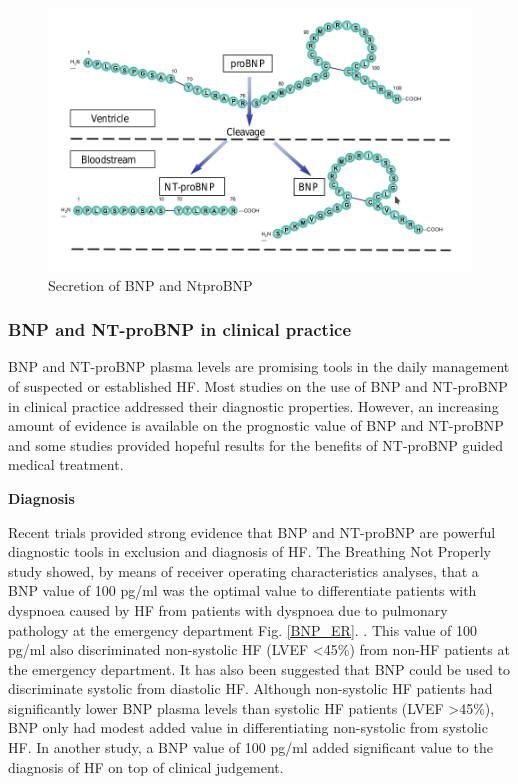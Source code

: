 \documentclass[14pt,a4paper,onecolumn]{extarticle}
\begin{document}
\begin{figure}
    \centering
    \includegraphics[scale=0.4]{../../images/BNP_secretion.png}
    \small\caption{Secretion of BNP and NtproBNP}
    \label{BNP_secretion}
\end{figure}

\subsubsection{BNP and NT-proBNP in clinical practice}
BNP and NT-proBNP plasma levels are promising tools in the daily management of suspected or established HF. Most studies on the use of BNP and NT-proBNP in clinical practice addressed their diagnostic properties. However, an increasing amount of evidence is available on the prognostic value of BNP and NT-proBNP and some studies provided hopeful results for the benefits of NT-proBNP guided medical treatment.

\textbf{Diagnosis}

Recent trials provided strong evidence that BNP and NT-proBNP are powerful diagnostic tools in exclusion and diagnosis of HF. The Breathing Not Properly study showed, by means of receiver operating characteristics analyses, that a BNP value of 100 pg/ml was the optimal value to differentiate patients with dyspnoea caused by HF from patients with dyspnoea due to pulmonary pathology at the emergency department Fig. \ref{BNP_ER}. \citep{Maisel2002}.  This value of 100 pg/ml also discriminated non-systolic HF (LVEF <45\%) from non-HF patients at the emergency department. It has also been suggested that BNP could be used to discriminate systolic from diastolic HF. Although non-systolic HF patients had significantly lower BNP plasma levels than systolic HF patients (LVEF >45\%), BNP only had modest added value in differentiating non-systolic from systolic HF. In another study, a BNP value of 100 pg/ml added significant value to the diagnosis of HF on top of clinical judgement. \citep{McCullough2002}
\end{document}
